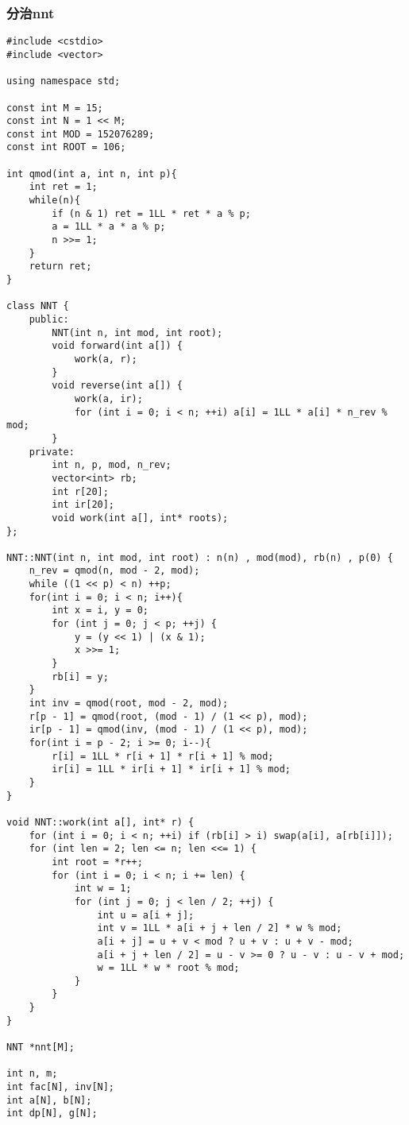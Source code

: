 \subsubsection{分治nnt}
\begin{verbatim}
#include <cstdio>
#include <vector>

using namespace std;

const int M = 15;
const int N = 1 << M;  
const int MOD = 152076289; 
const int ROOT = 106;

int qmod(int a, int n, int p){
    int ret = 1;
    while(n){
        if (n & 1) ret = 1LL * ret * a % p;
        a = 1LL * a * a % p;
        n >>= 1;
    }
    return ret;
}

class NNT {
    public:
        NNT(int n, int mod, int root);
        void forward(int a[]) {
            work(a, r);
        }
        void reverse(int a[]) {
            work(a, ir);
            for (int i = 0; i < n; ++i) a[i] = 1LL * a[i] * n_rev % mod;
        }
    private:
        int n, p, mod, n_rev;
        vector<int> rb; 
        int r[20]; 
        int ir[20]; 
        void work(int a[], int* roots);
};

NNT::NNT(int n, int mod, int root) : n(n) , mod(mod), rb(n) , p(0) {
    n_rev = qmod(n, mod - 2, mod);
    while ((1 << p) < n) ++p;
    for(int i = 0; i < n; i++){
        int x = i, y = 0;
        for (int j = 0; j < p; ++j) {
            y = (y << 1) | (x & 1);
            x >>= 1;
        }
        rb[i] = y;
    }
    int inv = qmod(root, mod - 2, mod);
    r[p - 1] = qmod(root, (mod - 1) / (1 << p), mod);
    ir[p - 1] = qmod(inv, (mod - 1) / (1 << p), mod);
    for(int i = p - 2; i >= 0; i--){
        r[i] = 1LL * r[i + 1] * r[i + 1] % mod;
        ir[i] = 1LL * ir[i + 1] * ir[i + 1] % mod;
    }
}

void NNT::work(int a[], int* r) {
    for (int i = 0; i < n; ++i) if (rb[i] > i) swap(a[i], a[rb[i]]);
    for (int len = 2; len <= n; len <<= 1) {
        int root = *r++;
        for (int i = 0; i < n; i += len) {
            int w = 1;
            for (int j = 0; j < len / 2; ++j) {
                int u = a[i + j];
                int v = 1LL * a[i + j + len / 2] * w % mod;
                a[i + j] = u + v < mod ? u + v : u + v - mod;
                a[i + j + len / 2] = u - v >= 0 ? u - v : u - v + mod;
                w = 1LL * w * root % mod;
            }
        }
    }
}

NNT *nnt[M];

int n, m;
int fac[N], inv[N];
int a[N], b[N];
int dp[N], g[N];


\end{verbatim}
